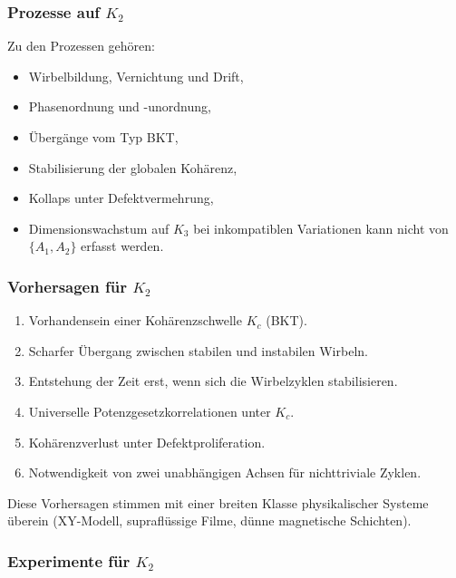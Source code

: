 \subsubsection{Prozesse auf \texorpdfstring{$K_2$}{K_2}}

Zu den Prozessen gehören:
\begin{itemize}
    \item Wirbelbildung, Vernichtung und Drift,
    \item Phasenordnung und -unordnung,
    \item Übergänge vom Typ BKT,
    \item Stabilisierung der globalen Kohärenz,
    \item Kollaps unter Defektvermehrung,
    \item Dimensionswachstum auf $K_3$ bei inkompatiblen Variationen
          kann nicht von $\{A_1, A_2\}$ erfasst werden.
\end{itemize}

\subsubsection{Vorhersagen für \texorpdfstring{$K_2$}{K_2}}

\begin{enumerate}
    \item Vorhandensein einer Kohärenzschwelle $K_c$ (BKT).
    \item Scharfer Übergang zwischen stabilen und instabilen Wirbeln.
    \item Entstehung der Zeit erst, wenn sich die Wirbelzyklen stabilisieren.
    \item Universelle Potenzgesetzkorrelationen unter $K_c$.
    \item Kohärenzverlust unter Defektproliferation.
    \item Notwendigkeit von zwei unabhängigen Achsen für nichttriviale Zyklen.
\end{enumerate}

Diese Vorhersagen stimmen mit einer breiten Klasse physikalischer Systeme überein (XY-Modell,
supraflüssige Filme, dünne magnetische Schichten).

\subsubsection{Experimente für \texorpdfstring{$K_2$}{K_2}}


